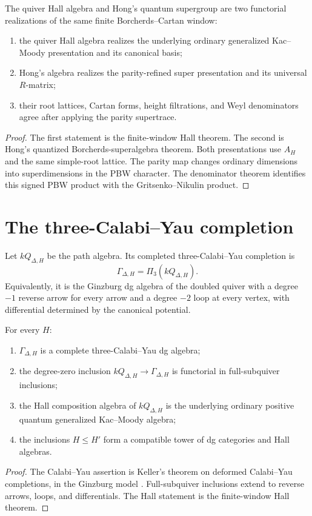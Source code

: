 \begin{theorem}
The quiver Hall algebra and Hong's quantum supergroup are two functorial realizations of the same finite Borcherds--Cartan window:
\begin{enumerate}
\item the quiver Hall algebra realizes the underlying ordinary generalized Kac--Moody presentation and its canonical basis;
\item Hong's algebra realizes the parity-refined super presentation and its universal $R$-matrix;
\item their root lattices, Cartan forms, height filtrations, and Weyl denominators agree after applying the parity supertrace.
\end{enumerate}
\end{theorem}
\begin{proof}
The first statement is the finite-window Hall theorem.  The second is Hong's quantized Borcherds-superalgebra theorem.  Both presentations use $A_H$ and the same simple-root lattice.  The parity map changes ordinary dimensions into superdimensions in the PBW character.  The denominator theorem identifies this signed PBW product with the Gritsenko--Nikulin product.
\end{proof}

\chapter{The three-Calabi--Yau completion}
Let $kQ_{\Delta,H}$ be the path algebra.  Its completed three-Calabi--Yau completion is
\[
 \Gamma_{\Delta,H}=\Pi_3(kQ_{\Delta,H}).
\]
Equivalently, it is the Ginzburg dg algebra of the doubled quiver with a degree $-1$ reverse arrow for every arrow and a degree $-2$ loop at every vertex, with differential determined by the canonical potential.

\begin{theorem}
For every $H$:
\begin{enumerate}
\item $\Gamma_{\Delta,H}$ is a complete three-Calabi--Yau dg algebra;
\item the degree-zero inclusion $kQ_{\Delta,H}\to\Gamma_{\Delta,H}$ is functorial in full-subquiver inclusions;
\item the Hall composition algebra of $kQ_{\Delta,H}$ is the underlying ordinary positive quantum generalized Kac--Moody algebra;
\item the inclusions $H\le H'$ form a compatible tower of dg categories and Hall algebras.
\end{enumerate}
\end{theorem}
\begin{proof}
The Calabi--Yau assertion is Keller's theorem on deformed Calabi--Yau completions, in the Ginzburg model \cite{KellerCY,GinzburgCY}.  Full-subquiver inclusions extend to reverse arrows, loops, and differentials.  The Hall statement is the finite-window Hall theorem.
\end{proof}

